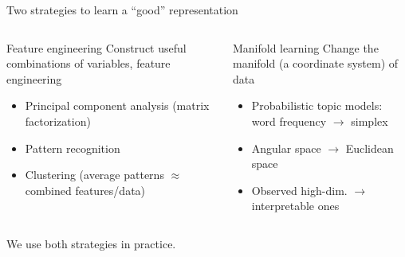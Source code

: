 \documentclass[
  ignorenonframetext,
  aspectratio=169]{beamer}
\begin{document}
\begin{frame}{Two strategies to learn a ``good'' representation}
\protect\hypertarget{two-strategies-to-learn-a-good-representation}{}
\begin{columns}[T]
\begin{column}{.45\textwidth}
\begin{block}{Feature engineering}
\protect\hypertarget{feature-engineering}{}
Construct useful combinations of variables, feature engineering

\begin{itemize}
\item
  Principal component analysis (matrix factorization)
\item
  Pattern recognition
\item
  Clustering (average patterns \(\approx\) combined features/data)
\end{itemize}
\end{block}
\end{column}

\begin{column}{.45\textwidth}
\begin{block}{Manifold learning}
\protect\hypertarget{manifold-learning}{}
Change the manifold (a coordinate system) of data

\begin{itemize}
\item
  Probabilistic topic models: word frequency \(\to\) simplex
\item
  Angular space \(\to\) Euclidean space
\item
  Observed high-dim. \(\to\) interpretable ones
\end{itemize}
\end{block}
\end{column}
\end{columns}

We use both strategies in practice.
\end{frame}
\end{document}
